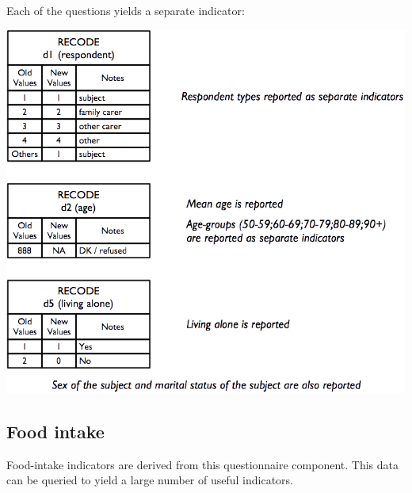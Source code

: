 \documentclass[12pt,a4paper]{book}
\theoremstyle{definition}
\theoremstyle{definition}
\theoremstyle{definition}
\theoremstyle{remark}
\begin{document}
\newpage

Each of the questions yields a separate indicator:

\begin{center}\includegraphics{figures/indicators03} \end{center}

\hypertarget{food-intake}{%
\subsection{Food intake}\label{food-intake}}

Food-intake indicators are derived from this questionnaire component.
This data can be queried to yield a large number of useful indicators.

\newpage
\end{document}
